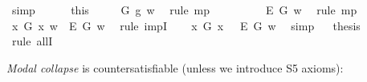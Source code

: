 \begin{isabellebody}
\ simp\isanewline
\ \ \ \ \isamarkupfalse%
\ this\ {}\ \isamarkupfalse%
\ {}{\isacharcolon}\ {\isachardoublequoteopen}{\isasymE}\ G\ g\ w{\isachardoublequoteclose}\ \isamarkupfalse%
\ {\isacharparenleft}rule\ mp{\isacharparenright}\isanewline
\ \ \ \ \isamarkupfalse%
\ {}\ {}\ \isamarkupfalse%
\ {\isachardoublequoteopen}{\isacharparenleft}\isactrlbold {\isasymbox}\isactrlbold {\isasymexists}\isactrlsup E\ G{\isacharparenright}\ w{\isachardoublequoteclose}\ \isamarkupfalse%
\ {\isacharparenleft}rule\ mp{\isacharparenright}\isanewline
\ \ \isacommand{{\isacharbraceright}}\isamarkupfalse%
\isanewline
\ \ \isamarkupfalse%
\ {\isachardoublequoteopen}{\isacharparenleft}{\isasymexists}x{\isachardot}\ G\ x\ w{\isacharparenright}\ {\isasymlongrightarrow}\ {\isacharparenleft}\isactrlbold {\isasymbox}\isactrlbold {\isasymexists}\isactrlsup E\ G{\isacharparenright}\ w{\isachardoublequoteclose}\ \isamarkupfalse%
\ {\isacharparenleft}rule\ impI{\isacharparenright}\isanewline
\ \ \isamarkupfalse%
\ {\isachardoublequoteopen}{\isacharparenleft}{\isacharparenleft}\isactrlbold {\isasymexists}x{\isachardot}\ G\ x{\isacharparenright}\ \isactrlbold {\isasymrightarrow}\ \ \isactrlbold {\isasymbox}\isactrlbold {\isasymexists}\isactrlsup E\ G{\isacharparenright}\ w{\isachardoublequoteclose}\ \isamarkupfalse%
\ simp\isanewline
\isacommand{{\isacharbraceright}}\isamarkupfalse%
\isanewline
\ \isamarkupfalse%
\ {\isacharquery}thesis\ \isamarkupfalse%
\ {\isacharparenleft}rule\ allI{\isacharparenright}\ \isanewline
{}\isamarkupfalse%
%
\endisatagproof
{\isafoldproof}%
%
\isadelimproof
%
\endisadelimproof
%
\begin{isamarkuptext}%
\emph{Modal collapse} is countersatisfiable (unless we introduce S5 axioms):%
\end{isamarkuptext}\isamarkuptrue%
\isamarkupfalse%
\ {\isachardoublequoteopen}{\isasymlfloor}\isactrlbold {\isasymforall}{\isasymPhi}{\isachardot}{\isacharparenleft}{\isasymPhi}\ \isactrlbold {\isasymrightarrow}\ {\isacharparenleft}\isactrlbold {\isasymbox}\ {\isasymPhi}{\isacharparenright}{\isacharparenright}{\isasymrfloor}{\isachardoublequoteclose}\ \isamarkupfalse%
%
\isadelimproof
\ %
\endisadelimproof
%
\isatagproof
{}\isamarkupfalse%
%
\endisatagproof
{\isafoldproof}%
%
\isadelimproof
%
\endisadelimproof

\end{isabellebody}
